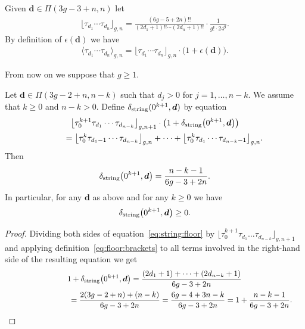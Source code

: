Given $\boldsymbol{d}\in\Pi(3g-3+n,n)$ let
\begin{gather}\label{eq:floor:brackets}
\lfloor \tau_{d_1} \cdots \tau_{d_n}\rfloor_{g,n}=
\frac{(6g-5+2n)!!}{(2d_1+1)!!\cdots(2d_n+1)!!}
\cdot\frac{1}{g!\cdot 24^g} .
\end{gather}
By definition of $\epsilon(\boldsymbol{d})$ we have
\begin{gather}\label{eq:def:of:epsilon}
\langle \tau_{d_1} \cdots \tau_{d_n}\rangle_{g,n}
=
\lfloor \tau_{d_1} \cdots \tau_{d_n}\rfloor_{g,n}
\cdot\big(1+\epsilon(\boldsymbol{d})\big) .
\end{gather}

From now on we suppose that $g\ge 1$.

\begin{Lemma}\label{lm:string}
Let $\boldsymbol{d}\in\Pi(3g-2+n,n-k)$ such that
$d_j>0$ for $j=1,\dots,n-k$. We assume that $k\ge 0$ and $n-k>0$.
Define $\delta_{\rm string}(0^{k+1},\boldsymbol{d})$
by equation
\begin{gather}
\big\lfloor \tau_0^{k+1}\tau_{d_1} \cdots \tau_{d_{n-k}}\big\rfloor_{g,n+1}
\cdot\big(1+\delta_{\rm string}\big(0^{k+1},\boldsymbol{d}\big)\big)
\nonumber\\
\qquad{} =
\big\lfloor \tau_0^k\tau_{d_1-1} \cdots \tau_{d_{n-k}}\big\rfloor_{g,n}
+\dots +\big\lfloor \tau_0^k\tau_{d_1} \cdots \tau_{d_{n-k}-1}\big\rfloor_{g,n} .\label{eq:string:floor}
\end{gather}
Then
\[
\delta_{\rm string}\big(0^{k+1},\boldsymbol{d}\big)=\frac{n-k-1}{6g-3+2n} .
\]
In particular, for any $\boldsymbol{d}$ as above and for any
$k\ge 0$ we have
\begin{gather}\label{eq:delta:string:is:positive}
\delta_{\rm string}\big(0^{k+1},\boldsymbol{d}\big)\ge 0 .
\end{gather}
\end{Lemma}

\begin{proof}Dividing both sides of equation~\eqref{eq:string:floor} by
$\big\lfloor \tau_0^{k+1}\tau_{d_1} \dots \tau_{d_{n-k}}\big\rfloor_{g,n+1}$
and applying definition~\eqref{eq:floor:brackets}
to all terms involved in the right-hand side of the resulting
equation we get
\begin{gather*}
1+\delta_{\rm string}\big(0^{k+1},\boldsymbol{d}\big)
=\frac{(2d_1+1)+\dots+(2d_{n-k}+1)}{6g-3+2n}
 \\
 \hphantom{1+\delta_{\rm string}\big(0^{k+1},\boldsymbol{d}\big)}{} =
\frac{2(3g-2+n)+(n-k)}{6g-3+2n}
=\frac{6g-4+3n-k}{6g-3+2n}
=1+\frac{n-k-1}{6g-3+2n} .\!\!\!\tag*{\qed}
\end{gather*}\renewcommand{\qed}{}
\end{proof}

